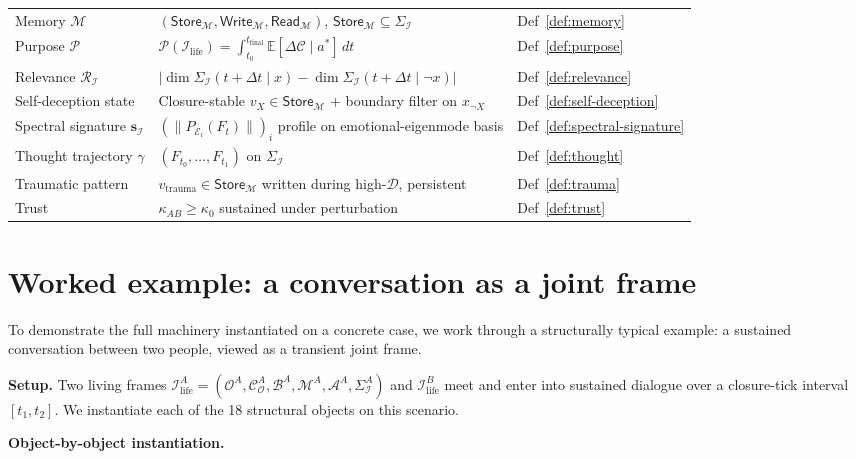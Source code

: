 \documentclass[11pt]{article}
\theoremstyle{plain}
\theoremstyle{definition}
\theoremstyle{remark}
\newcommand{\Ical}{\mathcal{I}}
\newcommand{\Ocal}{\mathcal{O}}
\newcommand{\Ccal}{\mathcal{C}}
\newcommand{\Mcal}{\mathcal{M}}
\newcommand{\Acal}{\mathcal{A}}
\newcommand{\Bcal}{\mathcal{B}}
\newcommand{\Rcal}{\mathcal{R}}
\newcommand{\Dcal}{\mathcal{D}}
\newcommand{\Pcal}{\mathcal{P}}
\newcommand{\Ilife}{\Ical_{\mathrm{life}}}
\begin{document}
\begin{table}[h]
\begin{tabular}{p{2.8cm}p{6.0cm}p{3.0cm}}
Memory $\Mcal$ & $(\mathsf{Store}_\Mcal, \mathsf{Write}_\Mcal, \mathsf{Read}_\Mcal)$, $\mathsf{Store}_\Mcal \subseteq \Sigma_\Ical$ & Def~\ref{def:memory} \\
Purpose $\Pcal$ & $\Pcal(\Ilife) = \int_{t_0}^{t_{\mathrm{final}}} \mathbb{E}[\Delta\Ccal \mid a^*] \, dt$ & Def~\ref{def:purpose} \\
Relevance $\Rcal_\Ical$ & $|\dim\Sigma_\Ical(t+\Delta t \mid x) - \dim\Sigma_\Ical(t+\Delta t \mid \neg x)|$ & Def~\ref{def:relevance} \\
Self-deception state & Closure-stable $v_X \in \mathsf{Store}_\Mcal$ + boundary filter on $x_{\neg X}$ & Def~\ref{def:self-deception} \\
Spectral signature $\mathbf{s}_\Ical$ & $(\|P_{\mathcal{E}_i}(F_t)\|)_i$ profile on emotional-eigenmode basis & Def~\ref{def:spectral-signature} \\
Thought trajectory $\gamma$ & $(F_{t_0}, \ldots, F_{t_1})$ on $\Sigma_\Ical$ & Def~\ref{def:thought} \\
Traumatic pattern & $v_{\mathrm{trauma}} \in \mathsf{Store}_\Mcal$ written during high-$\Dcal$, persistent & Def~\ref{def:trauma} \\
Trust & $\kappa_{AB} \geq \kappa_0$ sustained under perturbation & Def~\ref{def:trust} \\
\bottomrule
\end{tabular}
\end{table}

\section{Worked example: a conversation as a joint frame}\label{sec:worked-example}

To demonstrate the full machinery instantiated on a concrete case, we work through a structurally typical example: a sustained conversation between two people, viewed as a transient joint frame.

\textbf{Setup.} Two living frames $\Ilife^A = (\Ocal^A, \Ccal_\Ocal^A, \Bcal^A, \Mcal^A, \Acal^A, \Sigma_\Ical^A)$ and $\Ilife^B$ meet and enter into sustained dialogue over a closure-tick interval $[t_1, t_2]$. We instantiate each of the 18 structural objects on this scenario.

\textbf{Object-by-object instantiation.}
\end{document}

